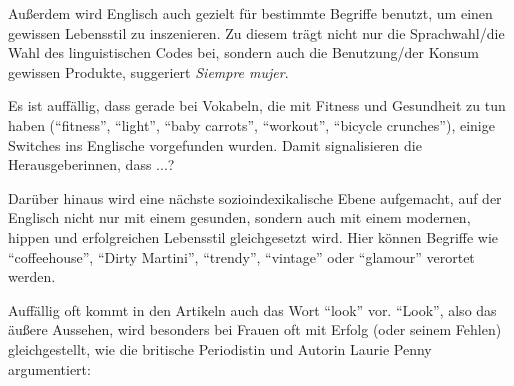 \begin{comment}
Wie von~\cite{Ticknor12} und~\cite{Mahootian05} gefunden, wird durch eine Benutzung des bilingualen Codes vermutlich versucht, eine Art Komplizenschaft zwischen den Herausgeberinnen der Zeitschrift und den Leserinnen herzustellen.
Schließlich gehört Code-Switching eben zu den Charakteristiken einer bilingualen Latina-Identität.
Für solche Art Switches wäre es im Grunde egal, was genau geswitcht wird, Hauptsache, die kommen vor, und unterstreichen dabei die Gemeinsamkeit mit den Leserinnen.
Und grad bei den Englisch-Switches in dem vorwiegend spanischen Text kann man wieder meinen, dass sich die Sprecherinnen (bzw. in dem Fall die Zeitschriftredakteurinnen, die diese 2.generation Latina-Sprecherinnen erreichen möchten) sich von der monolingualen Elterngeneration abgrenzen wollen.
\end{comment}

Außerdem wird Englisch auch gezielt für bestimmte Begriffe benutzt, um einen gewissen Lebensstil zu inszenieren.
Zu diesem trägt nicht nur die Sprachwahl/die Wahl des linguistischen Codes bei, sondern auch die Benutzung/der Konsum gewissen Produkte, suggeriert \textit{Siempre mujer}.

Es ist auffällig, dass gerade bei Vokabeln, die mit Fitness und Gesundheit zu tun haben (``fitness'', ``light'', ``baby carrots'', ``workout'', ``bicycle crunches''), einige Switches ins Englische vorgefunden wurden.
Damit signalisieren die Herausgeberinnen, dass ...?

Darüber hinaus wird eine nächste sozioindexikalische Ebene aufgemacht, auf der Englisch nicht nur mit einem gesunden, sondern auch mit einem modernen, hippen und erfolgreichen Lebensstil gleichgesetzt wird.
Hier können Begriffe wie ``coffeehouse'', ``Dirty Martini'', ``trendy'', ``vintage'' oder ``glamour'' verortet werden.

Auffällig oft kommt in den Artikeln auch das Wort ``look'' vor.
``Look'', also das äußere Aussehen, wird besonders bei Frauen oft mit Erfolg (oder seinem Fehlen) gleichgestellt, wie die britische Periodistin und Autorin Laurie Penny argumentiert:

